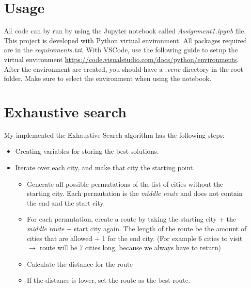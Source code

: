 \documentclass{article}
\begin{document}
    
    
    \section{Usage}

    All code can by run by using the Jupyter notebook called \textit{Assignment1.ipynb} file. \\

    This project is developed with Python virtual environment.  
    All packages required are in the \textit{requirements.txt}.
    With VSCode, use the following guide to setup the virtual environment \url{https://code.visualstudio.com/docs/python/environments}. \\

    After the environment are created, you should have a \textit{.venv} directory in the root folder. 
    Make sure to select the environment when using the notebook. 

    \newpage

    \section{Exhaustive search}

    My implemented the Exhaustive Search algorithm has the following steps: 

    \begin{itemize}
        \item Creating variables for storing the best solutions.
        \item Iterate over each city, and make that city the starting point. 
        \begin{itemize}
            \item Generate all possible permutations of the list of cities without the starting city. Each permutation is the \textit{middle route} and does not contain the end and the start city.
            \item For each permutation, create a route by taking the starting city + the \textit{middle route} + start city again. The length of the route be the amount of cities that are allowed + 1 for the end city. (For example 6 cities to visit $\to$ route will be 7 cities long, because we always have to return)
            \item Calculate the distance for the route
            \item If the distance is lower, set the route as the best route. 
        \end{itemize}
    \end{itemize}
\end{document}
